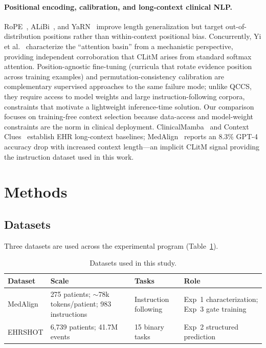 \documentclass{article}
\begin{document}
\paragraph{Positional encoding, calibration, and long-context clinical NLP.}
RoPE~\cite{su2021roformer}, ALiBi~\cite{press2022alibi}, and YaRN~\cite{peng2024yarn}
improve length generalization but target out-of-distribution positions rather than
within-context positional bias. Concurrently, Yi et al.~\cite{yi2025attentionbasin}
characterize the ``attention basin'' from a mechanistic perspective, providing
independent corroboration that CLitM arises from standard softmax attention.
Position-agnostic fine-tuning (curricula that rotate evidence position across training
examples) and permutation-consistency calibration are complementary supervised
approaches to the same failure mode; unlike QCCS, they require access to model weights
and large instruction-following corpora, constraints that motivate a lightweight
inference-time solution. Our comparison focuses on training-free context selection
because data-access and model-weight constraints are the norm in clinical deployment.
ClinicalMamba~\cite{yang2024clinicalmamba} and Context Clues~\cite{wornow2025context}
establish EHR long-context baselines; MedAlign~\cite{fleming2024medalign} reports an
8.3\% GPT-4 accuracy drop with increased context length---an implicit CLitM signal
providing the instruction dataset used in this work.

\section{Methods}
\label{sec:methods}

\subsection{Datasets}

Three datasets are used across the experimental program (Table~\ref{tab:datasets}).

\begin{table}[h]
\centering
\caption{Datasets used in this study.}
\label{tab:datasets}
\small
\begin{tabular}{@{}p{2.5cm}p{4.2cm}p{2.5cm}p{2.8cm}@{}}
\toprule
Dataset & Scale & Tasks & Role \\
\midrule
MedAlign \cite{fleming2024medalign}
  & 275 patients; $\sim$78k tokens/patient; 983 instructions
  & Instruction following
  & Exp~1 characterization; Exp~3 gate training \\[2pt]
EHRSHOT \cite{wornow2023ehrshot}
  & 6,739 patients; 41.7M events
  & 15 binary tasks
  & Exp~2 structured prediction \\
\bottomrule
\end{tabular}
\end{table}
\end{document}
